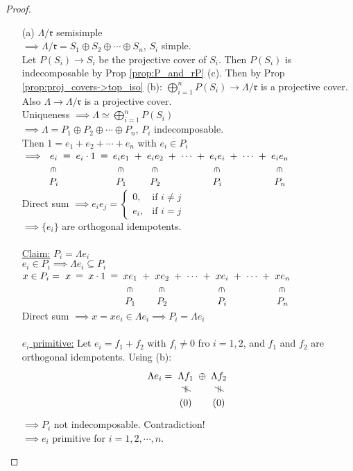 \begin{prop}
\begin{proof}
\begin{enumerate}
\item[(a)] $\Lambda / \mathfrak{r}$ semisimple\\
$\implies \Lambda / \mathfrak{r} = S_1 \oplus S_2 \oplus \cdots \oplus S_n$, $S_i$ simple.\\
Let $P(S_i) \to S_i$ be the projective cover of $S_i$. Then $P(S_i)$ is indecomposable by Prop \ref{prop:P_and_rP} (c). Then by Prop \ref{prop:proj_covers->top_iso} (b): $\bigoplus_{i=1}^n P(S_i) \to \Lambda/ \mathfrak{r}$ is a projective cover. Also $\Lambda \to \Lambda / \mathfrak{r}$ is a projective cover.\\
Uniqueness $\implies \Lambda \simeq \bigoplus_{i=1}^n P(S_i)$\\
$\implies \Lambda = P_1 \oplus P_2 \oplus \cdots \oplus P_n$, $P_i$ indecomposable.\\
Then $1 = e_1 + e_2 + \cdots + e_n$ with $e_i \in P_i$\\
$\implies \xymatrix@C-1pc@R-1pc{
e_i \ar@{}[r]|-*[@]{=} \ar@{}[d]|-*[@]{\in} & e_i \cdot 1 \ar@{}[r]|-*[@]{=} & e_ie_1 \ar@{}[r]|-*[@]{+}\ar@{}[d]|-*[@]{\in} & e_ie_2 \ar@{}[r]|-*[@]{+}\ar@{}[d]|-*[@]{\in} & \cdots \ar@{}[r]|-*[@]{+} & e_ie_i \ar@{}[r]|-*[@]{+}\ar@{}[d]|-*[@]{\in} & \cdots \ar@{}[r]|-*[@]{+} & e_ie_n\ar@{}[d]|-*[@]{\in}\\
P_i &             & P_1    & P_2    &        & P_i    &        &  P_n
}$\\
Direct sum $\implies e_ie_j = \left\lbrace \begin{matrix}
0, & \text{if } i \neq j\\
e_i, & \text{if } i = j
\end{matrix} \right.$\\
$\implies \{ e_i \}$ are orthogonal idempotents.\\
\\
\underline{Claim:} $P_i = \Lambda e_i$\\
$e_i \in P_i \implies \Lambda e_i \subseteq P_i$\\
$x \in P_i = \xymatrix@C-1pc@R-1pc{
x \ar@{}[r]|-*[@]{=}  & x \cdot 1 \ar@{}[r]|-*[@]{=} & xe_1 \ar@{}[r]|-*[@]{+}\ar@{}[d]|-*[@]{\in} & xe_2 \ar@{}[r]|-*[@]{+}\ar@{}[d]|-*[@]{\in} & \cdots \ar@{}[r]|-*[@]{+} & xe_i \ar@{}[r]|-*[@]{+}\ar@{}[d]|-*[@]{\in} & \cdots \ar@{}[r]|-*[@]{+} & xe_n\ar@{}[d]|-*[@]{\in}\\
 &             & P_1    & P_2    &        & P_i    &        &  P_n
}$\\
Direct sum $\implies x = xe_i \in \Lambda e_i \implies P_i = \Lambda e_i$\\
\\
\underline{$e_i$ primitive:} Let $e_i = f_1 + f_2$ with $f_i \neq 0$ fro $i=1,2$, and $f_1$ and $f_2$ are orthogonal idempotents. Using (b):
\[
\Lambda e_i = \xymatrix@C-1pc@R-1pc{ \Lambda f_1 \ar@{}[r]|-*[@]{\oplus}\ar@{}[d]|-*[@]{\neq} & \Lambda f_2 \ar@{}[d]|-*[@]{\neq}\\ (0) & (0)}
\]
$\implies P_i $ not indecomposable. Contradiction!\\
$\implies e_i$ primitive for $i = 1, 2, \cdots , n$.


\end{enumerate}
\end{proof}
\end{prop}

